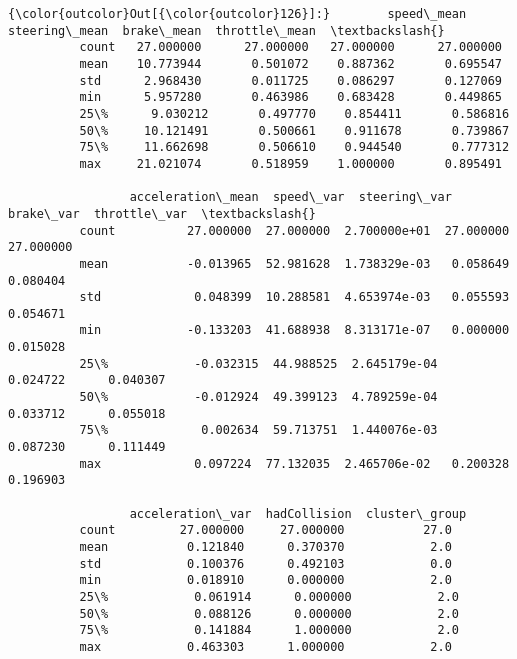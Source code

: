 \documentclass[11pt]{article}
\begin{document}
\begin{Verbatim}[commandchars=\\\{\}]
{\color{outcolor}Out[{\color{outcolor}126}]:}        speed\_mean  steering\_mean  brake\_mean  throttle\_mean  \textbackslash{}
          count   27.000000      27.000000   27.000000      27.000000   
          mean    10.773944       0.501072    0.887362       0.695547   
          std      2.968430       0.011725    0.086297       0.127069   
          min      5.957280       0.463986    0.683428       0.449865   
          25\%      9.030212       0.497770    0.854411       0.586816   
          50\%     10.121491       0.500661    0.911678       0.739867   
          75\%     11.662698       0.506610    0.944540       0.777312   
          max     21.021074       0.518959    1.000000       0.895491   
          
                 acceleration\_mean  speed\_var  steering\_var  brake\_var  throttle\_var  \textbackslash{}
          count          27.000000  27.000000  2.700000e+01  27.000000     27.000000   
          mean           -0.013965  52.981628  1.738329e-03   0.058649      0.080404   
          std             0.048399  10.288581  4.653974e-03   0.055593      0.054671   
          min            -0.133203  41.688938  8.313171e-07   0.000000      0.015028   
          25\%            -0.032315  44.988525  2.645179e-04   0.024722      0.040307   
          50\%            -0.012924  49.399123  4.789259e-04   0.033712      0.055018   
          75\%             0.002634  59.713751  1.440076e-03   0.087230      0.111449   
          max             0.097224  77.132035  2.465706e-02   0.200328      0.196903   
          
                 acceleration\_var  hadCollision  cluster\_group  
          count         27.000000     27.000000           27.0  
          mean           0.121840      0.370370            2.0  
          std            0.100376      0.492103            0.0  
          min            0.018910      0.000000            2.0  
          25\%            0.061914      0.000000            2.0  
          50\%            0.088126      0.000000            2.0  
          75\%            0.141884      1.000000            2.0  
          max            0.463303      1.000000            2.0  
\end{Verbatim}
            

    
    
    
    
\end{document}
